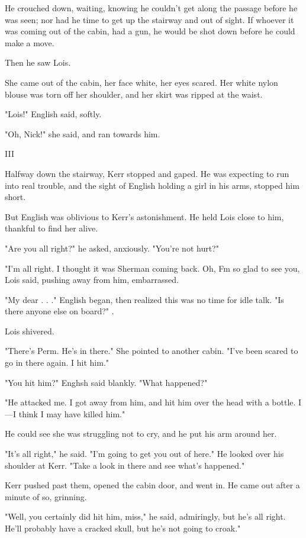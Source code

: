 \documentclass{novel}
\begin{document}
He crouched down, waiting, knowing he couldn't get along the passage before he was seen; nor had he time to get up the stairway and out of sight. If whoever it was coming out of the cabin, had a gun, he would be shot down before he could make a move.

Then he saw Lois.

She came out of the cabin, her face white, her eyes scared. Her white nylon blouse was torn off her shoulder, and her skirt was ripped at the waist.

"Lois!" English said, softly.

"Oh, Nick!" she said, and ran towards him.



III

Halfway down the stairway, Kerr stopped and gaped. He was expecting to run into real trouble, and the sight of English holding a girl in his arms, stopped him short.

But English was oblivious to Kerr's astonishment. He held Lois close to him, thankful to find her alive.

"Are you all right?" he asked, anxiously. "You're not hurt?"

"I'm all right. I thought it was Sherman coming back. Oh, Fm so glad to see you, Lois said, pushing away from him, embarrassed.

"My dear . . ." English began, then realized this was no time for idle talk. "Is there anyone else on board?" .

Lois shivered.

"There's Perm. He's in there." She pointed to another cabin. "I've been scared to go in there again. I hit him."

"You hit him?" Enghsh said blankly. "What happened?"

"He attacked me. I got away from him, and hit him over the head with a bottle. I—I think I may have killed him."

He could see she was struggling not to cry, and he put his arm around her.

"It's all right," he said. "I'm going to get you out of here." He looked over his shoulder at Kerr. "Take a look in there and see what's happened."

Kerr pushed past them, opened the cabin door, and went in. He came out after a minute of so, grinning.

"Well, you certainly did hit him, miss," he said, admiringly, but he's all right. He'll probably have a cracked skull, but he's not going to croak."
\end{document}
